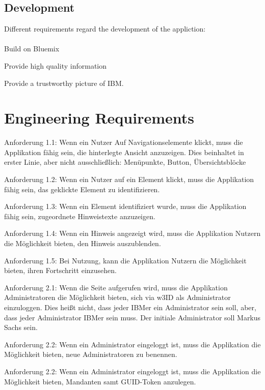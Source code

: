 \subsection{Development}
Different requirements regard the development of the appliction: 
\paragraph{}
\begin{closeItemCol}
    \item Build on Bluemix
    \item Provide high quality information
    \item Provide a trustworthy picture of IBM.
\end{closeItemCol}

\section{Engineering Requirements}
Anforderung 1.1: Wenn ein Nutzer Auf Navigationselemente klickt, muss die Applikation fähig sein, die hinterlegte Ansicht anzuzeigen. 
Dies beinhaltet in erster Linie, aber nicht ausschließlich: Menüpunkte, Button, Übersichtsblöcke


Anforderung 1.2: Wenn ein Nutzer auf ein Element klickt, muss die Applikation fähig sein, das geklickte Element zu identifizieren.


Anforderung 1.3: Wenn ein Element identifiziert wurde, muss die Applikation fähig sein, zugeordnete Hinweistexte anzuzeigen.


Anforderung 1.4: Wenn ein Hinweis angezeigt wird, muss die Applikation Nutzern die Möglichkeit bieten, den Hinweis auszublenden.


Anforderung 1.5: Bei Nutzung, kann die Applikation Nutzern die Möglichkeit bieten, ihren Fortschritt einzusehen.


Anforderung 2.1: Wenn die Seite aufgerufen wird, muss die Applikation Administratoren die Möglichkeit bieten, sich via w3ID als Administrator einzuloggen.
Dies heißt nicht, dass jeder IBMer ein Administrator sein soll, aber, dass jeder Administrator IBMer sein muss. Der initiale Administrator soll Markus Sachs sein.


Anforderung 2.2: Wenn ein Administrator eingeloggt ist, muss die Applikation die Möglichkeit bieten, neue Administratoren zu benennen. 


Anforderung 2.2: Wenn ein Administrator eingeloggt ist, muss die Applikation die Möglichkeit bieten, Mandanten samt GUID-Token anzulegen.


